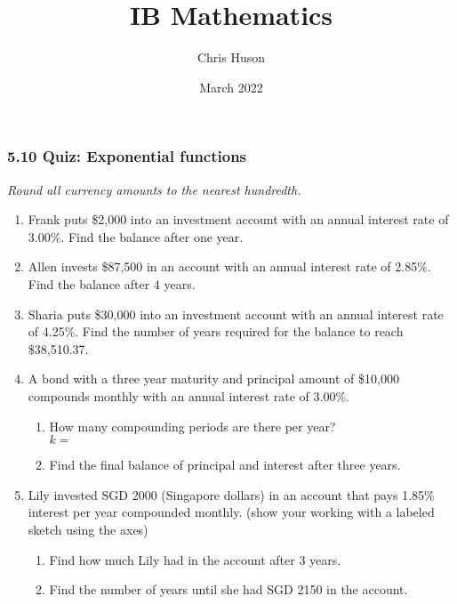 \documentclass[12pt, twoside]{article}
\title{IB Mathematics}
\author{Chris Huson}
\date{March 2022}
\begin{document}
\subsubsection*{5.10 Quiz: Exponential functions}
\emph{Round all currency amounts to the nearest hundredth.}
\begin{enumerate}
\item Frank puts \$2,000 into an investment account with an annual interest rate of 3.00\%. Find the balance after one year. \vspace{1.5cm}

\item Allen invests \$87,500 in an account with an annual interest rate of 2.85\%. Find the balance after 4 years. \vspace{1.5cm}

\item Sharia puts \$30,000 into an investment account with an annual interest rate of 4.25\%. Find the number of years required for the balance to reach \$38,510.37. \vspace{2cm}

\item A bond with a three year maturity and principal amount of \$10,000 compounds monthly with an annual interest rate of 3.00\%.
\begin{enumerate}[itemsep=0.5cm]
    \item How many compounding periods are there per year? \\[0.25cm]
    $k=$
    \item Find the final balance of principal and interest after three years.
\end{enumerate} \vspace{1.5cm}

\item Lily invested SGD 2000 (Singapore dollars) in an account that pays 1.85\% interest per year compounded monthly. (show your working with a labeled sketch using the axes)
\begin{multicols}{2}
    \begin{enumerate}[itemsep=1cm]
        \item Find how much Lily had in the account after 3 years.
        \item Find the number of years until she had SGD 2150 in the account.
    \end{enumerate} \vspace{0.5cm}
    \begin{flushright}
    \end{flushright}
\end{multicols}



\end{enumerate}
\end{document}

